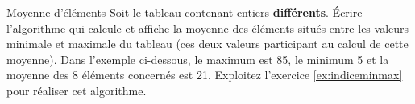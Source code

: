 \begin{Exercice}{Moyenne d'éléments}
	Soit le tableau  contenant
	 entiers \textbf{différents}. Écrire l’algorithme
	qui calcule et affiche la moyenne des éléments situés entre les valeurs
	minimale et maximale du tableau (ces deux valeurs participant au calcul
	de cette moyenne). Dans l’exemple ci-dessous, le maximum est 85, le
	minimum 5 et la moyenne des 8 éléments concernés est 21. Exploitez
	l'exercice \vref{ex:indiceminmax} pour réaliser cet algorithme. 
	
	\begin{center}
	\tablehead{}
	\begin{supertabular}{|m{0.35cm}|m{0.35cm}|m{0.35cm}|m{0.35cm}|m{0.315cm}|m{0.31700003cm}|m{0.35cm}|m{0.35cm}|m{0.31700003cm}|m{0.35cm}|m{0.35cm}|m{0.35cm}|m{0.35cm}|m{0.35cm}|m{0.35cm}|m{0.35cm}|m{0.35cm}|m{0.35cm}|m{0.35cm}|m{0.48800004cm}|}
	\hline
	 &
	 &
	 &
	 &
	 &
	 &
	 &
	 &
	 &
	 &
	 &
	 &
	 &
	 &
	 &
	 &
	 &
	 &
	 &
	\centering{}\\\hline
	\end{supertabular}
	\end{center}
\end{Exercice}

